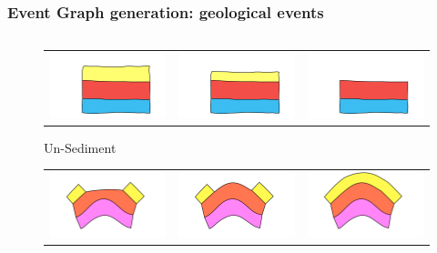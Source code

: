 \documentclass{beamer}
\begin{document}
	\begin{frame}
	\frametitle{Event Graph generation: geological events}
	\begin{columns}
	\begin{column}{0.55\textwidth}
	\begin{figure}[H]
	\centering
	\begin{tabular}{@{}ccc@{}}
	\includegraphics[width=.34\textwidth]{unSedimentDescription0.png}&
	\includegraphics[width=.34\textwidth]{unSedimentDescription1.png}&
	\includegraphics[width=.34\textwidth]{unSedimentDescription2.png}\\
	\end{tabular}
	\caption{Un-Sediment}
	\label{unsedeg2}
	\end{figure}
	\begin{figure}[H]
	\centering
	\begin{tabular}{@{}ccc@{}}
	\includegraphics[width=.34\textwidth]	{unErodeConvexDescription0.png}&
	\includegraphics[width=.34\textwidth]{unErodeConvexDescription1.png}&
	\includegraphics[width=.34\textwidth]	{unErodeConvexDescription2.png}\\

\end{tabular}
\end{figure}
\end{column}
\end{columns}
\end{frame}
\end{document}
